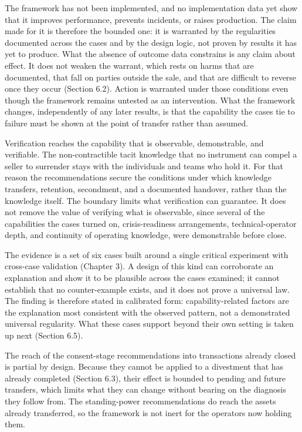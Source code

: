 \documentclass[twoside,fontset=lmodern]{mitthesis}
\begin{document}
The framework has not been implemented, and no implementation data yet
show that it improves performance, prevents incidents, or raises
production. The claim made for it is therefore the bounded one: it is
warranted by the regularities documented across the cases and by the
design logic, not proven by results it has yet to produce. What the
absence of outcome data constrains is any claim about effect. It does
not weaken the warrant, which rests on harms that are documented, that
fall on parties outside the sale, and that are difficult to reverse once
they occur (Section 6.2). Action is warranted under those conditions
even though the framework remains untested as an intervention. What the
framework changes, independently of any later results, is that the
capability the cases tie to failure must be shown at the point of
transfer rather than assumed.

Verification reaches the capability that is observable, demonstrable,
and verifiable. The non-contractible tacit knowledge that no instrument
can compel a seller to surrender stays with the individuals and teams
who hold it. For that reason the recommendations secure the conditions
under which knowledge transfers, retention, secondment, and a documented
handover, rather than the knowledge itself. The boundary limits what
verification can guarantee. It does not remove the value of verifying
what is observable, since several of the capabilities the cases turned
on, crisis-readiness arrangements, technical-operator depth, and
continuity of operating knowledge, were demonstrable before close.

The evidence is a set of six cases built around a single critical
experiment with cross-case validation (Chapter 3). A design of this kind
can corroborate an explanation and show it to be plausible across the
cases examined; it cannot establish that no counter-example exists, and
it does not prove a universal law. The finding is therefore stated in
calibrated form: capability-related factors are the explanation most
consistent with the observed pattern, not a demonstrated universal
regularity. What these cases support beyond their own setting is taken
up next (Section 6.5).

The reach of the consent-stage recommendations into transactions already
closed is partial by design. Because they cannot be applied to a
divestment that has already completed (Section 6.3), their effect is
bounded to pending and future transfers, which limits what they can
change without bearing on the diagnosis they follow from. The
standing-power recommendations do reach the assets already transferred,
so the framework is not inert for the operators now holding them.
\end{document}
